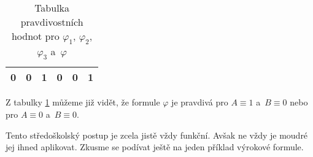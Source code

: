 \begin{example}
\begin{solution}
\begin{table}[H]
\begin{tabular}{|cc|cccc|}
            0   & 0   & 1               & 0                          & 0                    & 1                                          \\ \hline
            \end{tabular}
            \caption{Tabulka pravdivostních hodnot pro $\varphi_1$, $\varphi_2$, $\varphi_3$ a~$\varphi$}
            \label{tab:ex_vyrokova_formule_1}
        \end{table}
        Z tabulky \ref{tab:ex_vyrokova_formule_1} můžeme již vidět, že formule $\varphi$ je pravdivá pro $A\equiv 1$ a~$B\equiv 0$ nebo pro $A\equiv 0$ a~$B\equiv 0$.
    \end{solution}
\end{example}

Tento středoškolský postup je zcela jistě vždy funkční. Avšak ne vždy je moudré jej ihned aplikovat. Zkusme se podívat ještě na jeden příklad výrokové formule.
